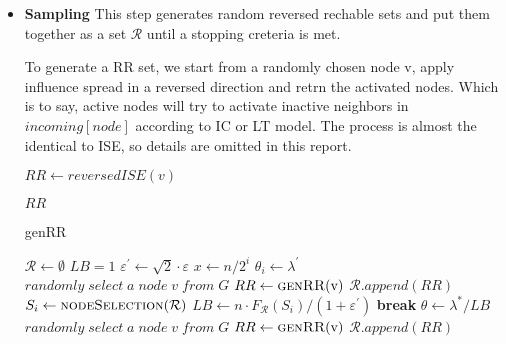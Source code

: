 \documentclass[conference]{IEEEtran}
\begin{document}
    \begin{itemize}
        \item \textbf{Sampling}
        This step generates random reversed rechable sets and put them together as a set $\mathcal{R}$ until a stopping creteria is met.

        
        
        To generate a RR set, we start from a randomly chosen node v, apply influence spread in a reversed direction and retrn the activated nodes. Which is to say, active nodes will try to activate inactive neighbors in $incoming[node]$ according to IC or LT model. The process is almost the identical to ISE, so details are omitted in this report.
        \begin{algorithm}[H]
            \begin{algorithmic}[1]
            \State $RR \gets reversedISE(v)$

            \Return $RR$
            \EndFunction
            \end{algorithmic}
            \caption{genRR}
        \end{algorithm}

        
        \begin{algorithm}[H]
            \begin{algorithmic}[1]
            \State $\mathcal{R} \gets \emptyset$
            \State $LB = 1$
            \State $\varepsilon^{\prime} \gets \sqrt{2} \cdot \varepsilon$
                \State $x \gets n/2^i$
                \State $\theta_{i} \gets \lambda^{\prime}$
                \State $ randomly\;select\;a\;node\;v\;from\;G$
                \State $RR \gets \Call{genRR}{$v$}$
                \State $\mathcal{R}.append(RR)$
                \EndWhile
                \State $S_i \gets \Call{nodeSelection}{\mathcal{R}}$
                    \State $LB \gets n\cdot F_{\mathcal{R}}(S_i)/(1+\varepsilon^{\prime})$
                    \State \textbf{break}
                \EndIf
            \EndFor
            \State $\theta \gets \lambda^{*}/LB$
            \State $ randomly\;select\;a\;node\;v\;from\;G$
            \State $RR \gets \Call{genRR}{$v$}$
            \State $\mathcal{R}.append(RR)$
            \EndWhile 



\end{algorithmic}
\end{algorithm}
\end{itemize}
\end{document}
